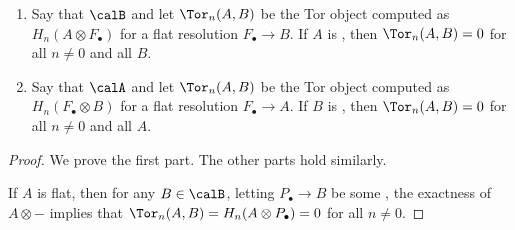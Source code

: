 \begin{lemma}
\begin{enumerate}
        \item Say that $\calB$  and let $\Tor_n(A,B)$ be the Tor object computed as $H_n(A \otimes F_\bullet)$ for a flat resolution $F_\bullet \to B$. 
        If $A$ is , then $\Tor_n(A,B) = 0$ for all $n \neq 0$ and all $B$.

        \item Say that $\calA$  and let $\Tor_n(A,B)$ be the Tor object computed as $H_n(F_\bullet \otimes B)$ for a flat resolution $F_\bullet \to A$. 
        If $B$ is , then $\Tor_n(A,B) = 0$ for all $n \neq 0$ and all $A$.
    \end{enumerate}
\end{lemma}

\begin{proof}
    We prove the first part. The other parts hold similarly.
    
    If $A$ is flat, then for any $B \in \calB$, letting $P_\bullet \to B$ be some , the exactness of $A \otimes -$ implies that $\Tor_n(A,B) = H_n(A \otimes P_\bullet) = 0$ for all $n \neq 0$.
\end{proof}
